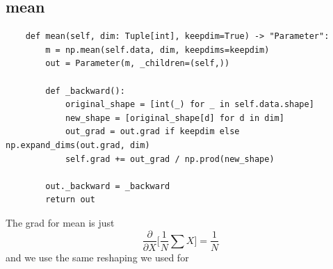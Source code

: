\documentclass[11pt]{article}
\begin{document}
\subsection{mean}
\begin{verbatim}
    def mean(self, dim: Tuple[int], keepdim=True) -> "Parameter":
        m = np.mean(self.data, dim, keepdims=keepdim)
        out = Parameter(m, _children=(self,))

        def _backward():
            original_shape = [int(_) for _ in self.data.shape]
            new_shape = [original_shape[d] for d in dim]
            out_grad = out.grad if keepdim else np.expand_dims(out.grad, dim)
            self.grad += out_grad / np.prod(new_shape)

        out._backward = _backward
        return out
\end{verbatim}
The grad for mean is just
\begin{equation}
  \frac{\partial}{\partial X} \big[\frac{1}{N}\sum{X}\big]= \frac{1}{N} 
\end{equation}
and we use the same reshaping we used for 
\end{document}
